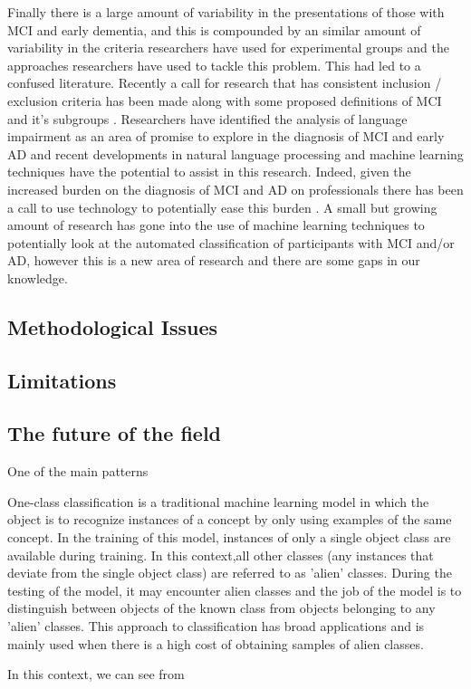Finally there is a large amount of variability in the presentations of those with MCI and early dementia, and this is compounded by an similar amount of variability in the criteria researchers have used for experimental groups and the approaches researchers have used to tackle this problem. This had led to a confused literature. Recently a call for research that has consistent inclusion / exclusion criteria has been made along with some proposed definitions of MCI and it's subgroups \cite{Petersen2014}. Researchers have identified the analysis of language impairment as an area of promise to explore in the diagnosis of MCI and early AD and recent developments in natural language processing and machine learning techniques have the potential to assist in this research. Indeed, given the increased burden on the diagnosis of MCI and AD on professionals there has been a call to use technology to potentially ease this burden \cite{Boschi2017}. A small but growing amount of research has gone into the use of machine learning techniques to potentially look at the automated classification of participants with MCI and/or AD, however this is a new area of research and there are some gaps in our knowledge.

\subsection{Methodological Issues}
\subsection{Limitations}

\subsection{The future of the field}
One of the main patterns 

One-class classification is a traditional machine learning model in which the object is to recognize instances of a concept by only using examples of the same concept. In the training of this model, instances of only a single object class are available during training. In this context,all other classes (any instances that deviate from the single object class) are referred to as 'alien' classes. During the testing of the model, it may encounter alien classes and the job of the model is to distinguish between objects of the known class from objects belonging to any 'alien' classes. This approach to classification has broad applications and is mainly used when there is a high cost of obtaining samples of alien classes.
\par 
In this context, we can see from 

